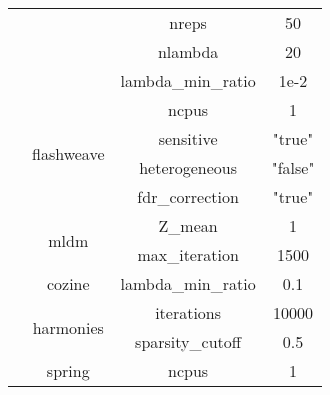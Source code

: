 \begin{table}[H]
\begin{tabular}{|c|c|c|c|}
                             &                                                                                         & nreps                  & 50             \\
                             &                                                                                         & nlambda                & 20             \\
                             &                                                                                         & lambda\_min\_ratio     & 1e-2           \\ \cline{2-4}
                             & \multirow{4}{*}{flashweave}                                                             & ncpus                  & 1              \\
                             &                                                                                         & sensitive              & "true"         \\
                             &                                                                                         & heterogeneous          & "false"        \\
                             &                                                                                         & fdr\_correction        & "true"         \\ \cline{2-4}
                             & \multirow{2}{*}{mldm}                                                                   & Z\_mean                & 1              \\
                             &                                                                                         & max\_iteration         & 1500           \\ \cline{2-4}
                             & cozine                                                                                  & lambda\_min\_ratio     & 0.1            \\ \cline{2-4}
                             & \multirow{2}{*}{harmonies}                                                              & iterations             & 10000          \\
                             &                                                                                         & sparsity\_cutoff       & 0.5            \\ \cline{2-4}
                             & \multirow{3}{*}{spring}                                                                 & ncpus                  & 1              \\

\end{tabular}
\end{table}
